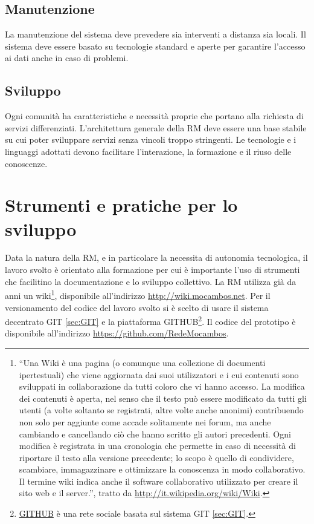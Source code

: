 \subsection{Manutenzione}
La manutenzione del sistema deve prevedere sia interventi a distanza
sia locali. Il sistema deve essere basato su tecnologie standard e
aperte per garantire l'accesso ai dati anche in caso di problemi.

\subsection{Sviluppo}
Ogni comunità ha caratteristiche e necessità proprie che portano alla
richiesta di servizi differenziati. L'architettura generale della RM
deve essere una base stabile su cui poter sviluppare servizi senza
vincoli troppo stringenti. Le tecnologie e i linguaggi adottati devono
facilitare l'interazione, la formazione e il riuso delle conoscenze. 

\section{Strumenti e pratiche per lo sviluppo}
Data la natura della RM, e in particolare la necessita di autonomia
tecnologica, il lavoro svolto è orientato alla formazione per cui è
importante l'uso di strumenti che facilitino la documentazione e lo
sviluppo collettivo. La RM utilizza già da anni un wiki\footnote{``Una
  Wiki è una pagina (o comunque una collezione di documenti
  ipertestuali) che viene aggiornata dai suoi utilizzatori e i cui
  contenuti sono sviluppati in collaborazione da tutti coloro che vi
  hanno accesso. La modifica dei contenuti è aperta, nel senso che il
  testo può essere modificato da tutti gli utenti (a volte soltanto se
  registrati, altre volte anche anonimi) contribuendo non solo per
  aggiunte come accade solitamente nei forum, ma anche cambiando e
  cancellando ciò che hanno scritto gli autori precedenti.  Ogni
  modifica è registrata in una cronologia che permette in caso di
  necessità di riportare il testo alla versione precedente; lo scopo è
  quello di condividere, scambiare, immagazzinare e ottimizzare la
  conoscenza in modo collaborativo. Il termine wiki indica anche il
  software collaborativo utilizzato per creare il sito web e il
  server.'', tratto da \url{http://it.wikipedia.org/wiki/Wiki}.},
disponibile all'indirizzo \url{http://wiki.mocambos.net}.  Per il
versionamento del codice del lavoro svolto si è scelto di usare il
sistema decentrato GIT \ref{sec:GIT} e la piattaforma
GITHUB\footnote{\href{http://github.com}{GITHUB} è una rete sociale
  basata sul sistema GIT \ref{sec:GIT}.}. Il codice del prototipo è
disponibile all'indirizzo \url{https://github.com/RedeMocambos}.

